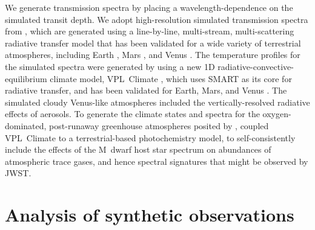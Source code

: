 We generate transmission spectra by placing a wavelength-dependence on the simulated transit depth. We adopt high-resolution simulated transmission spectra from \citet{Lincowski2018}, which are generated using a line-by-line, multi-stream, multi-scattering radiative transfer model \citep[SMART;][]{Meadows1996} that has been validated for a wide variety of terrestrial atmospheres, including Earth \citep{Robinson2011}, Mars \citep{Tinetti2005}, and Venus \citep{Meadows1996,Arney2014}. The temperature profiles for the simulated spectra were generated by \citet{Lincowski2018} using a new 1D radiative-convective-equilibrium climate model, VPL~Climate \citep{Robinson2018,Lincowski2018}, which uses SMART as its core for radiative transfer, and has been validated for Earth, Mars, and Venus \citep{Robinson2018}. The simulated cloudy Venus-like atmospheres included the vertically-resolved radiative effects of aerosols.
To generate the climate states and spectra for the oxygen-dominated, post-runaway greenhouse atmospheres posited by \citet{Luger2015b}, \citet{Lincowski2018} coupled VPL~Climate to a terrestrial-based photochemistry model, to self-consistently include the effects of the M~dwarf host star spectrum on abundances of atmospheric trace gases, and hence spectral signatures that might be observed by JWST. 





\section{Analysis of synthetic observations}

